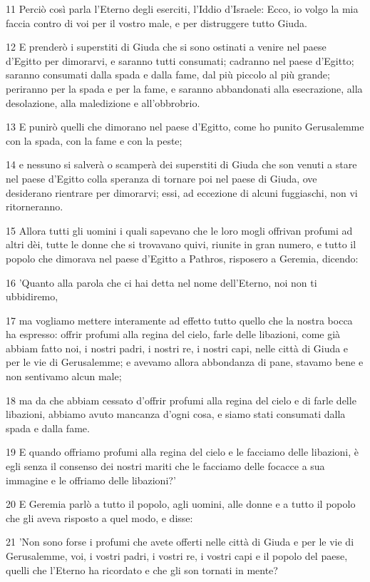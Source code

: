 \par 11 Perciò così parla l'Eterno degli eserciti, l'Iddio d'Israele: Ecco, io volgo la mia faccia contro di voi per il vostro male, e per distruggere tutto Giuda.
\par 12 E prenderò i superstiti di Giuda che si sono ostinati a venire nel paese d'Egitto per dimorarvi, e saranno tutti consumati; cadranno nel paese d'Egitto; saranno consumati dalla spada e dalla fame, dal più piccolo al più grande; periranno per la spada e per la fame, e saranno abbandonati alla esecrazione, alla desolazione, alla maledizione e all'obbrobrio.
\par 13 E punirò quelli che dimorano nel paese d'Egitto, come ho punito Gerusalemme con la spada, con la fame e con la peste;
\par 14 e nessuno si salverà o scamperà dei superstiti di Giuda che son venuti a stare nel paese d'Egitto colla speranza di tornare poi nel paese di Giuda, ove desiderano rientrare per dimorarvi; essi, ad eccezione di alcuni fuggiaschi, non vi ritorneranno.
\par 15 Allora tutti gli uomini i quali sapevano che le loro mogli offrivan profumi ad altri dèi, tutte le donne che si trovavano quivi, riunite in gran numero, e tutto il popolo che dimorava nel paese d'Egitto a Pathros, risposero a Geremia, dicendo:
\par 16 'Quanto alla parola che ci hai detta nel nome dell'Eterno, noi non ti ubbidiremo,
\par 17 ma vogliamo mettere interamente ad effetto tutto quello che la nostra bocca ha espresso: offrir profumi alla regina del cielo, farle delle libazioni, come già abbiam fatto noi, i nostri padri, i nostri re, i nostri capi, nelle città di Giuda e per le vie di Gerusalemme; e avevamo allora abbondanza di pane, stavamo bene e non sentivamo alcun male;
\par 18 ma da che abbiam cessato d'offrir profumi alla regina del cielo e di farle delle libazioni, abbiamo avuto mancanza d'ogni cosa, e siamo stati consumati dalla spada e dalla fame.
\par 19 E quando offriamo profumi alla regina del cielo e le facciamo delle libazioni, è egli senza il consenso dei nostri mariti che le facciamo delle focacce a sua immagine e le offriamo delle libazioni?'
\par 20 E Geremia parlò a tutto il popolo, agli uomini, alle donne e a tutto il popolo che gli aveva risposto a quel modo, e disse:
\par 21 'Non sono forse i profumi che avete offerti nelle città di Giuda e per le vie di Gerusalemme, voi, i vostri padri, i vostri re, i vostri capi e il popolo del paese, quelli che l'Eterno ha ricordato e che gli son tornati in mente?
